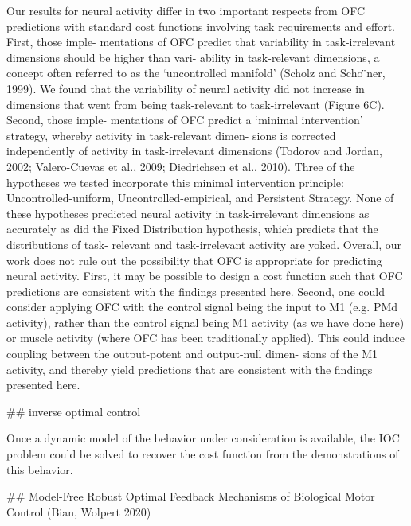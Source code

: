 \documentclass[../main.tex]{subfiles}
\begin{document}
{{Our results for neural activity differ in two important respects from OFC predictions with standard cost functions involving task requirements and effort. First, those imple- mentations of OFC predict that variability in task-irrelevant dimensions should be higher than vari- ability in task-relevant dimensions, a concept often referred to as the ‘uncontrolled manifold’ (Scholz and Scho ̈ner, 1999). We found that the variability of neural activity did not increase in dimensions that went from being task-relevant to task-irrelevant (Figure 6C). Second, those imple- mentations of OFC predict a ‘minimal intervention’ strategy, whereby activity in task-relevant dimen- sions is corrected independently of activity in task-irrelevant dimensions (Todorov and Jordan, 2002; Valero-Cuevas et al., 2009; Diedrichsen et al., 2010). Three of the hypotheses we tested incorporate this minimal intervention principle: Uncontrolled-uniform, Uncontrolled-empirical, and Persistent Strategy. None of these hypotheses predicted neural activity in task-irrelevant dimensions as accurately as did the Fixed Distribution hypothesis, which predicts that the distributions of task- relevant and task-irrelevant activity are yoked. Overall, our work does not rule out the possibility that OFC is appropriate for predicting neural activity. First, it may be possible to design a cost function such that OFC predictions are consistent with the findings presented here. Second, one could consider applying OFC with the control signal being the input to M1 (e.g. PMd activity), rather than the control signal being M1 activity (as we have done here) or muscle activity (where OFC has been traditionally applied). This could induce coupling between the output-potent and output-null dimen- sions of the M1 activity, and thereby yield predictions that are consistent with the findings presented here.

## inverse optimal control

Once a dynamic model of the behavior under consideration is available, the IOC problem could be solved to recover the cost function from the demonstrations of this behavior.



## Model-Free Robust Optimal Feedback Mechanisms of Biological Motor Control (Bian, Wolpert 2020)

}}
\end{document}

